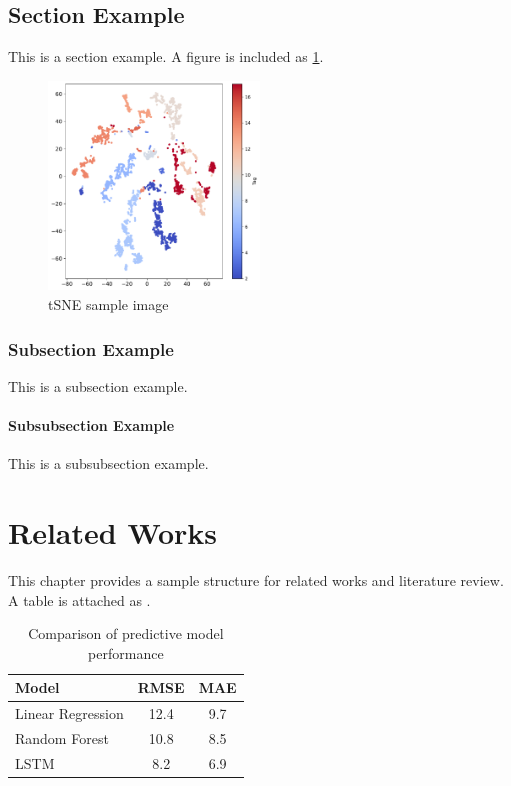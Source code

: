 \documentclass{kmou_thesis}
\begin{document}
\section{Section Example}\label{section:first}
This is a section example. A figure is included as \cref{fig:tsne}.
\begin{figure}[htbp]
  \centering
  \includegraphics[width=0.5\textwidth]{tsne_2d.pdf}
  \caption{tSNE sample image}\label{fig:tsne}
\end{figure}

\subsection{Subsection Example}
This is a subsection example.

\subsubsection{Subsubsection Example}
This is a subsubsection example.



\chapter{Related Works}
This chapter provides a sample structure for related works and literature review.
A table is attached as .

\begin{table}[htbp]
  \centering
  \begin{tabular}{lcc}
    \hline
    Model & RMSE & MAE \\
    \hline
    Linear Regression & 12.4 & 9.7 \\
    Random Forest     & 10.8 & 8.5 \\
    LSTM              &  8.2 & 6.9 \\
    \hline
  \end{tabular}
  \caption{Comparison of predictive model performance}\label{table:performance}
\end{table}
\end{document}
